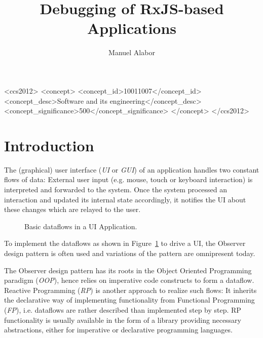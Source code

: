 \documentclass[sigplan,screen,review]{acmart}
\title{Debugging of RxJS-based Applications}
\author{Manuel Alabor}
\affiliation{
	\institution{HSR University of Applied Sciences}
	\city{Rapperswil}
	\country{Switzerland}
}
\begin{document}
\begin{abstract}
	
\end{abstract}

\begin{CCSXML}
	<ccs2012>
	   <concept>
		   <concept_id>10011007</concept_id>
		   <concept_desc>Software and its engineering</concept_desc>
		   <concept_significance>500</concept_significance>
		   </concept>
	 </ccs2012>
\end{CCSXML}



\maketitle

\section{Introduction}

The (graphical) user interface (\emph{UI} or \emph{GUI}) of an application handles two constant flows of data: External user input (e.g. mouse, touch or keyboard interaction) is interpreted and forwarded to the system. Once the system processed an interaction and updated its internal state accordingly, it notifies the UI about these changes which are relayed to the user.

\begin{figure}
	\centering
	\caption{Basic dataflows in a UI Application.}
	\label{fig:ui-data-flows}
\end{figure}

To implement the dataflows as shown in Figure~\ref{fig:ui-data-flows} to drive a UI, the Observer design pattern\cite{gamma1995design} is often used and variations of the pattern are omnipresent today.

The Observer design pattern has its roots in the Object Oriented Programming paradigm (\emph{OOP}), hence relies on imperative code constructs to form a dataflow. Reactive Programming (\emph{RP}) is another approach to realize such flows: It inherits the declarative way of implementing functionality from Functional Programming (\emph{FP}), i.e. dataflows are rather described than implemented step by step\cite{10.1145/2501654.2501666}. RP functionality is usually available in the form of a library providing necessary abstractions, either for imperative or declarative programming languages.
\end{document}
